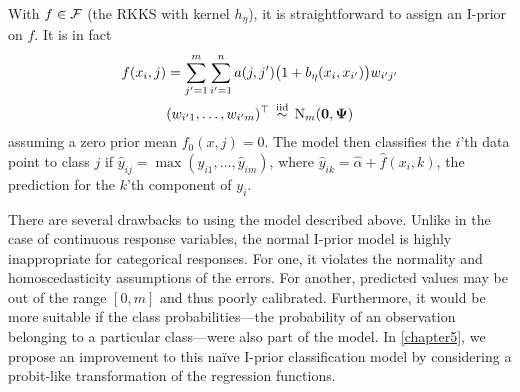 With $f \in {\mathcal F}$ (the RKKS with kernel $h_\eta$), it is straightforward to assign an I-prior on $f$. 
It is in fact
\begin{align}\label{eq:naiveclassiprior}
  \begin{gathered}
    f(x_i,j) = \sum_{j'=1}^m\sum_{i'=1}^n a(j,j')\big(1 + b_\eta(x_i,x_{i'})\big) w_{i'j'} \\
    (w_{i'1},\dots,w_{i'm})^\top \,\overset{\text{iid}}{\sim}\, \operatorname{N}_m({\mathbf 0},{\bm\Psi})
  \end{gathered}
\end{align}
assuming a zero prior mean $f_0(x,j) = 0$.
The model then classifies the $i$'th data point to class $j$ if $\hat y_{ij} = \max(\hat y_{i1},\dots,\hat y_{im})$, where $\hat y_{ik} = \hat\alpha + \hat f(x_i,k)$, the prediction for the $k$'th component of $y_i$.

There are several drawbacks to using the model described above.
Unlike in the case of continuous response variables, the normal I-prior model is highly inappropriate for categorical responses.
For one, it violates the normality and homoscedasticity assumptions of the errors.
For another, predicted values may be out of the range $[0,m]$ and thus poorly calibrated.
Furthermore, it would be more suitable if the class probabilities---the probability of an observation belonging to a particular class---were also part of the model.
In \cref{chapter5}, we propose an improvement to this naïve I-prior classification model by considering a probit-like transformation of the regression functions.

%  
%  
%  
%  

